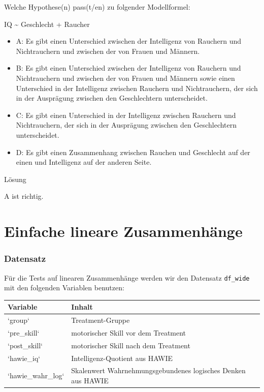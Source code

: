 \documentclass[
]{book}
\newenvironment{Shaded}{\begin{snugshade}}{\end{snugshade}}
\newcommand{\NormalTok}[1]{#1}
\newcommand{\SpecialCharTok}[1]{\textcolor[rgb]{0.00,0.00,0.00}{#1}}
\begin{document}
Welche Hypothese(n) pass(t/en) zu folgender Modellformel:

\begin{Shaded}
\begin{Highlighting}[]
\NormalTok{IQ }\SpecialCharTok{\textasciitilde{}}\NormalTok{ Geschlecht }\SpecialCharTok{+}\NormalTok{ Raucher}
\end{Highlighting}
\end{Shaded}

\begin{itemize}
\item
  A: Es gibt einen Unterschied zwischen der Intelligenz von Rauchern und Nichtrauchern und zwischen der von Frauen und Männern.
\item
  B: Es gibt einen Unterschied zwischen der Intelligenz von Rauchern und Nichtrauchern und zwischen der von Frauen und Männern sowie einen Unterschied in der Intelligenz zwischen Rauchern und Nichtrauchern, der sich in der Ausprägung zwischen den Geschlechtern unterscheidet.
\item
  C: Es gibt einen Unterschied in der Intelligenz zwischen Rauchern und Nichtrauchern, der sich in der Ausprägung zwischen den Geschlechtern unterscheidet.
\item
  D: Es gibt einen Zusammenhang zwischen Rauchen und Geschlecht auf der einen und Intelligenz auf der anderen Seite.
\end{itemize}

Lösung

A ist richtig.

\hypertarget{einfache-lineare-zusammenhuxe4nge}{%
\chapter{Einfache lineare Zusammenhänge}\label{einfache-lineare-zusammenhuxe4nge}}

\hypertarget{datensatz}{%
\subsection{Datensatz}\label{datensatz}}

Für die Tests auf linearen Zusammenhänge werden wir den Datensatz \texttt{df\_wide} mit den folgenden Variablen benutzen:

\begin{tabular}[t]{ll}
\toprule
Variable & Inhalt\\
\midrule
`group` & Treatment-Gruppe\\
`pre\_skill` & motorischer Skill vor dem Treatment\\
`post\_skill` & motorischer Skill nach dem Treatment\\
`hawie\_iq` & Intelligenz-Quotient aus HAWIE\\
`hawie\_wahr\_log` & Skalenwert Wahrnehmungsgebundenes logisches Denken aus HAWIE\\
\bottomrule
\end{tabular}
\end{document}
